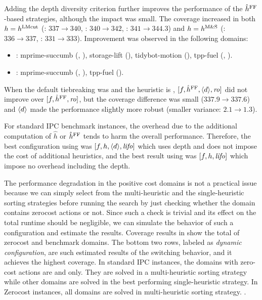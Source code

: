 Adding the depth diversity criterion further improves the performance of the $\hat{h}^{\text{FF}}$-based strategies,
 although the impact was small.
The coverage increased in both
 $h=h^\text{LMcut}$ (\fifo: $337\rightarrow 340$, \lifo: $340\rightarrow 342$, \ro: $341\rightarrow 344.3$) and
 $h=h^\text{M\&S}$ (\fifo: $336\rightarrow 337$, \lifo: $331\rightarrow 333$).
Improvement was observed in the following domains:
\begin{itemize}
 \item \textbf{\lmcut}: mprime-succumb (\lifo, \ro), storage-lift (\ro), tidybot-motion (\fifo), tpp-fuel (\fifo, \ro).
 \item \textbf{\mands}: mprime-succumb (\lifo, \ro), tpp-fuel (\fifo).
\end{itemize}
When the default tiebreaking was \ro and the heuristic is \mands, $[f,\hat{h}^{\text{FF}},{\left<d\right>},{\text{\textit{ro}}}]$ did not improve
over $[f,\hat{h}^{\text{FF}},{\text{\textit{ro}}}]$, but the coverage difference was small ($337.9\rightarrow 337.6$) and ${\left<d\right>}$ made the performance slightly more robust (smaller variance: $2.1\rightarrow 1.3$).

For standard IPC benchmark instances, the overhead due to the additional computation of
$\hat{h}$ or $\hat{h}^{\text{FF}}$ tends to harm the overall performance.
Therefore, the best configuration using \lmcut was
$[f,h,{\left<d\right>},{\text{\textit{lifo}}}]$ which uses depth and does not impose the cost of
additional heuristics, and the best result using \mands
was $[f,h,{\text{\textit{lifo}}}]$ which impose no overhead including the depth.

The performance degradation in the positive cost domains is not a practical issue
because we can simply select from the multi-heuristic and the single-heuristic sorting strategies
before running the search by just checking whether the domain contains zerocost actions or not.
Since such a check is trivial and its effect on the total runtime should be negligible,
we can simulate the behavior of such a configuration and estimate the results.
Coverage results in  show the total of
zerocost and benchmark domains. The bottom two rows, labeled as \emph{dynamic configuration},
are such estimated results of the switching behavior, and it achieves the highest coverage.
In standard IPC instances, the domains with zero-cost actions are  and  only. They are solved in a multi-heuristic sorting strategy while other domains are solved in the best performing single-heuristic strategy. In Zerocost instances, all domains are solved in multi-heuristic sorting strategy.
.

